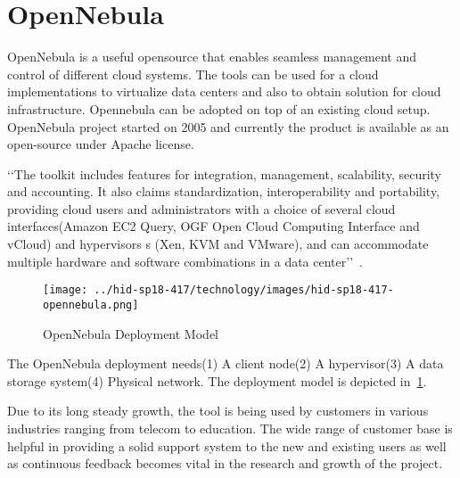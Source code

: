 
\section{OpenNebula}

OpenNebula is a useful opensource that enables seamless management and
control of different cloud systems.  The tools can be used for a cloud
implementations to virtualize data centers and also to obtain solution
for cloud infrastructure.  Opennebula can be adopted on top of an
existing cloud setup.  OpenNebula project started on 2005 and
currently the product is available as an open-source under Apache
license.

‘‘The toolkit includes features for integration, management,
scalability, security and accounting.  It also claims standardization,
interoperability and portability, providing cloud users and
administrators with a choice of several cloud interfaces(Amazon EC2
Query, OGF Open Cloud Computing Interface and vCloud) and hypervisors
s (Xen, KVM and VMware), and can accommodate multiple hardware and
software combinations in a data center’’~\cite{hid-sp18-417-opennebula-wiki}.

\begin{figure}[htb]
\texttt{[image: ../hid-sp18-417/technology/images/hid-sp18-417-opennebula.png]}
\caption{OpenNebula Deployment Model~\cite{hid-sp18-417-opennebula-deployment}} 
\label{F:opennebula}
\end{figure}

The OpenNebula deployment needs(1) A client node(2) A hypervisor(3)
A data storage system(4) Physical network. The deployment model is
depicted in~\ref{F:opennebula}.

Due to its long steady growth, the tool is being used by customers in
various industries ranging from telecom to education.  The wide range
of customer base is helpful in providing a solid support system to the
new and existing users as well as continuous feedback becomes vital in
the research and growth of the project.

